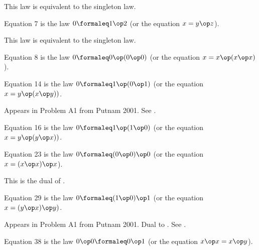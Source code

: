 This law is equivalent to the singleton law.

\begin{definition}[Equation 7]\label{eq7}\leanok{}  Equation 7 is the law $0 \formaleq 1 \op 2$ (or the equation $x = y \op z$).
\end{definition}

This law is equivalent to the singleton law.

\begin{definition}[Equation 8]\label{eq8}\leanok{}  Equation 8 is the law $0 \formaleq 0 \op (0 \op 0)$ (or the equation $x = x \op (x \op x)$).
\end{definition}

\begin{definition}[Equation 14]\label{eq14}\leanok{}  Equation 14 is the law $0 \formaleq  1 \op (0 \op 1)$ (or the equation $x = y \op (x \op y))$.
\end{definition}

Appears in Problem A1 from Putnam 2001.  See .

\begin{definition}[Equation 16]\label{eq16}\leanok{}  Equation 16 is the law $0 \formaleq  1 \op (1 \op 0)$ (or the equation $x = y \op (y \op x))$.
\end{definition}

\begin{definition}[Equation 23]\label{eq23}\leanok{}  Equation 23 is the law $0 \formaleq  (0 \op 0) \op 0$ (or the equation $x = (x \op x) \op x$).
\end{definition}

This is the dual of .

\begin{definition}[Equation 29]\label{eq29}\leanok{}  Equation 29 is the law $0 \formaleq  (1 \op 0) \op 1$ (or the equation $x = (y \op x) \op y)$.
\end{definition}

Appears in Problem A1 from Putnam 2001.  Dual to .  See .

\begin{definition}[Equation 38]\label{eq38}\leanok{}  Equation 38 is the law $0 \op 0  \formaleq  0 \op 1$ (or the equation $x \op x = x \op y$).
\end{definition}

